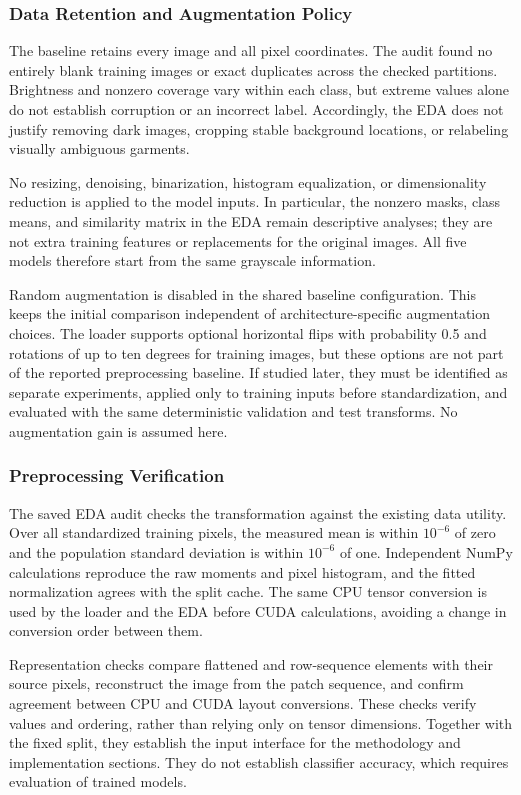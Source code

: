 \subsubsection{Data Retention and Augmentation Policy}
The baseline retains every image and all pixel coordinates. The audit found
no entirely blank training images or exact duplicates across the checked
partitions. Brightness and nonzero coverage vary within each class, but
extreme values alone do not establish corruption or an incorrect label.
Accordingly, the EDA does not justify removing dark images, cropping stable
background locations, or relabeling visually ambiguous garments.

No resizing, denoising, binarization, histogram equalization, or dimensionality
reduction is applied to the model inputs. In particular, the nonzero masks,
class means, and similarity matrix in the EDA remain descriptive analyses;
they are not extra training features or replacements for the original images.
All five models therefore start from the same grayscale information.

Random augmentation is disabled in the shared baseline configuration. This
keeps the initial comparison independent of architecture-specific augmentation
choices. The loader supports optional horizontal flips with probability 0.5
and rotations of up to ten degrees for training images, but these options are
not part of the reported preprocessing baseline. If studied later, they must
be identified as separate experiments, applied only to training inputs before
standardization, and evaluated with the same deterministic validation and
test transforms. No augmentation gain is assumed here.

\subsubsection{Preprocessing Verification}
The saved EDA audit checks the transformation against the existing data
utility. Over all standardized training pixels, the measured mean is within
\(10^{-6}\) of zero and the population standard deviation is within
\(10^{-6}\) of one. Independent NumPy calculations reproduce the raw moments
and pixel histogram, and the fitted normalization agrees with the split cache.
The same CPU tensor conversion is used by the loader and the EDA before CUDA
calculations, avoiding a change in conversion order between them.

Representation checks compare flattened and row-sequence elements with their
source pixels, reconstruct the image from the patch sequence, and confirm
agreement between CPU and CUDA layout conversions. These checks verify
values and ordering, rather than relying only on tensor dimensions.
Together with the fixed split, they establish the input interface for the
methodology and implementation sections. They do not establish classifier
accuracy, which requires evaluation of trained models.
\FloatBarrier
